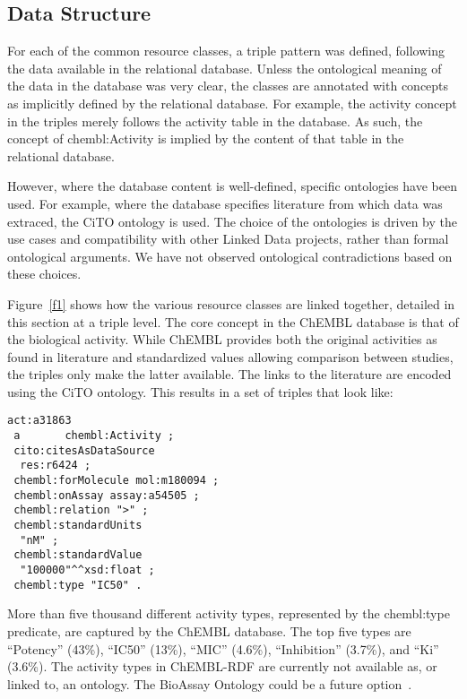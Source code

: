 \documentclass[10pt]{bmc_article}
\newenvironment{bmcformat}{\begin{raggedright}\baselineskip20pt\sloppy\setboolean{publ}{false}}{\end{raggedright}\baselineskip20pt\sloppy}
\begin{document}
\begin{bmcformat}
\subsection*{Data Structure}

For each of the common resource classes, a triple pattern was defined, following the
data available in the relational database. Unless the ontological meaning of the data
in the database was very clear, the classes are annotated with concepts as implicitly
defined by the relational database. For example, the activity concept in the triples
merely follows the activity table in the database. As such, the concept of chembl:Activity
is implied by the content of that table in the relational database.

However, where the database content is well-defined, specific ontologies have been used.
For example, where the database specifies literature from which data was extraced,
the CiTO ontology is used. The choice of the ontologies is driven by the use cases and
compatibility with other Linked Data projects, rather than formal ontological arguments.
We have not observed ontological contradictions based on these choices.

Figure~\ref{f1} shows how the various resource classes are linked together, detailed in
this section at a triple level.
The core concept in the ChEMBL database is that of the biological activity.
While ChEMBL provides both the original activities as found in literature
and standardized values allowing comparison between studies, the triples only
make the latter available. The links to the literature are encoded using the CiTO ontology.
This results in a set of triples that look like:

\begin{small}
\begin{verbatim}
act:a31863
 a       chembl:Activity ;
 cito:citesAsDataSource
  res:r6424 ;
 chembl:forMolecule mol:m180094 ;
 chembl:onAssay assay:a54505 ;
 chembl:relation ">" ;
 chembl:standardUnits
  "nM" ;
 chembl:standardValue
  "100000"^^xsd:float ;
 chembl:type "IC50" .
\end{verbatim}
\end{small}

More than five thousand different activity types, represented by the chembl:type predicate,
are captured by the ChEMBL database.
The top five types are ``Potency'' (43\%), ``IC50'' (13\%), ``MIC'' (4.6\%), ``Inhibition'' (3.7\%),
and ``Ki'' (3.6\%). The activity types in ChEMBL-RDF are currently not available as, or
linked to, an ontology. The BioAssay Ontology could be a future option~\cite{Visser2011}.


\end{bmcformat}
\end{document}

